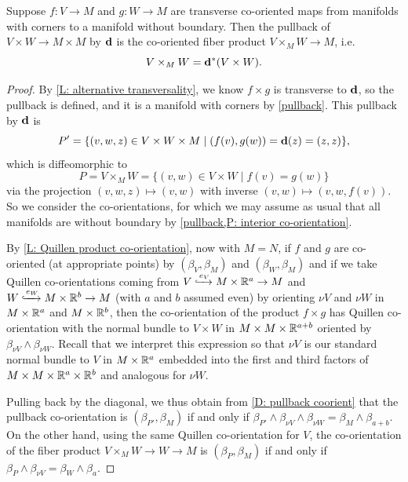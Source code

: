\begin{proposition}\label{P: cross to cup}
	Suppose $f \colon V \to M$ and $g \colon W \to M$ are transverse co-oriented maps from manifolds with corners to a manifold without boundary.
	Then the pullback of $V \times W \to M \times M$ by $\mathbf{d}$ is the co-oriented fiber product $V \times_M W \to M$, i.e.\ $$V \times_M W = \mathbf{d}^*(V \times W).$$
\end{proposition}

\begin{proof}
	By \cref{L: alternative transversality}, we know $f \times g$ is transverse to $\mathbf{d}$, so the pullback is defined, and it is a manifold with corners by \cref{pullback}.
	This pullback by $\mathbf{d}$ is $$P' = \{(v,w,z) \in V \times W \times M \mid (f(v),g(w)) = \mathbf{d}(z) = (z,z)\},$$ which is diffeomorphic to $$P = V \times_M W = \{(v,w) \in V \times W \mid f(v) = g(w)\}$$ via the projection $(v,w,z) \mapsto (v,w)$ with inverse $(v,w) \mapsto (v,w,f(v))$.
	So we consider the co-orientations, for which we may assume as usual that all manifolds are without boundary by \cref{pullback,P: interior co-orientation}.

	By \cref{L: Quillen product co-orientation}, now with $M = N$, if $f$ and $g$ are co-oriented (at appropriate points) by $(\beta_V,\beta_M)$ and $(\beta_W,\beta_M)$ and if we take Quillen co-orientations coming from $V \xhookrightarrow{e_V} M \times \mathbb{R}^a \to M$ and $W \xhookrightarrow{e_W} M \times \mathbb{R}^b \to M$ (with $a$ and $b$ assumed even) by orienting $\nu V$ and $\nu W$ in $M \times \mathbb{R}^a$ and $M \times \mathbb{R}^b$, then the co-orientation of the product $f \times g$ has Quillen co-orientation with the normal bundle to $V \times W$ in $M \times M \times \mathbb{R}^{a+b}$ oriented by $\beta_{\nu V} \wedge \beta_{\nu W}$.
	Recall that we interpret this expression so that $\nu V$ is our standard normal bundle to $V$ in $M \times \mathbb{R}^a$ embedded into the first and third factors of $M \times M \times \mathbb{R}^a \times \mathbb{R}^b$ and analogous for $\nu W$.

	Pulling back by the diagonal, we thus obtain from \cref{D: pullback coorient} that the pullback co-orientation is $(\beta_{P'},\beta_M)$ if and only if $\beta_{P'} \wedge \beta_{\nu V} \wedge \beta_{\nu W} = \beta_M \wedge \beta_{a+b}$.
	On the other hand, using the same Quillen co-orientation for $V$, the co-orientation of the fiber product $V \times_M W \to W \to M$ is $(\beta_P,\beta_M)$ if and only if $\beta_P \wedge \beta_{\nu V} = \beta_W \wedge \beta_a$.


\end{proof}
